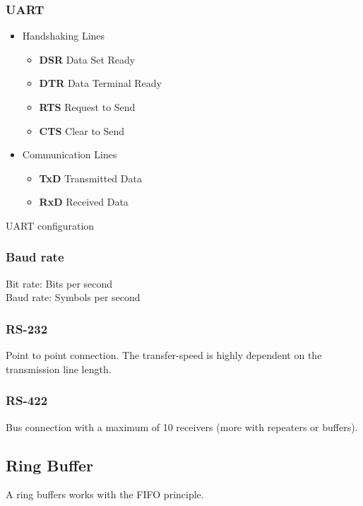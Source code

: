 \subsubsection{UART }
\begin{itemize}
	\itemsep-.5em
	\item Handshaking Lines 
	\begin{itemize}
		\itemsep-.5em 
		\item \textbf{DSR} Data Set Ready
		\item \textbf{DTR} Data Terminal Ready
		\item \textbf{RTS} Request to Send
		\item \textbf{CTS} Clear to Send
	\end{itemize}
	\item Communication Lines
	\begin{itemize}
		\itemsep-.5em
		\item \textbf{TxD} Transmitted Data
		\item \textbf{RxD} Received Data
	\end{itemize}
\end{itemize}

UART configuration 


\subsubsection{Baud rate}
Bit rate: Bits per second\\
Baud rate: Symbols per second

\subsubsection{RS-232 }
Point to point connection.
The transfer-speed is highly dependent on the transmission line length.

\subsubsection{RS-422}
Bus connection with a maximum of 10 receivers (more with repeaters or buffers).

\subsection{Ring Buffer}
A ring buffers works with the FIFO principle.

